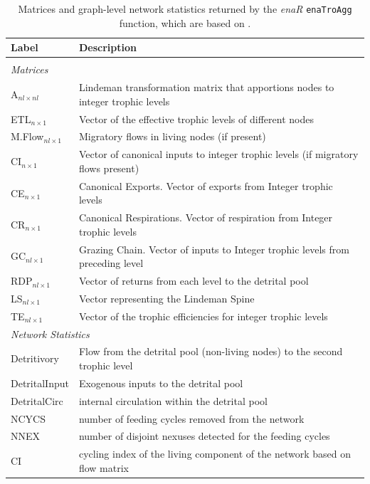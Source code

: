 \documentclass[article]{jss}
\begin{document}
 \begin{table}[t]
  \caption{Matrices and graph-level network statistics returned by the \textit{enaR}
    \texttt{enaTroAgg} function, which are based on \citet{ulanowicz1979trophic}.}\label{tab:trophic}
  \center
  \begin{small}
    \begin{tabularx}{\textwidth}{l p{10 cm}}
      \textbf{Label} & \textbf{Description} \\ \hline \\[-1.5ex]
      \multicolumn{2}{l}{\textit{Matrices}} \\[1ex]
      A$_{nl \times nl}$ & Lindeman transformation matrix that apportions nodes to integer trophic levels \\  %
      ETL$_{n \times 1}$ & Vector of the effective trophic levels of different nodes \\
      M.Flow$_{nl \times 1}$ & Migratory flows in living nodes (if present) \\
      CI$_{n \times 1}$ & Vector of canonical inputs to integer trophic levels (if migratory flows present) \\
      CE$_{n \times 1}$ & Canonical Exports. Vector of exports from Integer trophic levels \\
      CR$_{n \times 1}$ & Canonical Respirations. Vector of respiration from Integer trophic levels \\
      GC$_{nl \times 1}$ & Grazing Chain. Vector of inputs to Integer trophic levels from preceding level \\
      RDP$_{nl \times 1}$ & Vector of returns from each level to the detrital pool \\
      LS$_{nl \times 1}$ & Vector representing the Lindeman Spine \\
      TE$_{nl \times 1}$ & Vector of the trophic efficiencies for integer trophic levels\\[1ex]
      \multicolumn{2}{l}{\textit{Network Statistics}} \\[1ex]
      Detritivory & Flow from the detrital pool (non-living nodes) to the second trophic level \\
      DetritalInput & Exogenous inputs to the detrital pool \\
      DetritalCirc & internal circulation within the detrital pool \\
      NCYCS & number of feeding cycles removed from the network \\
      NNEX & number of disjoint nexuses detected for the feeding cycles \\
      CI & cycling index of the living component of the network based on flow matrix\\ \hline
\end{tabularx}
\end{small}
\end{table}
\end{document}
